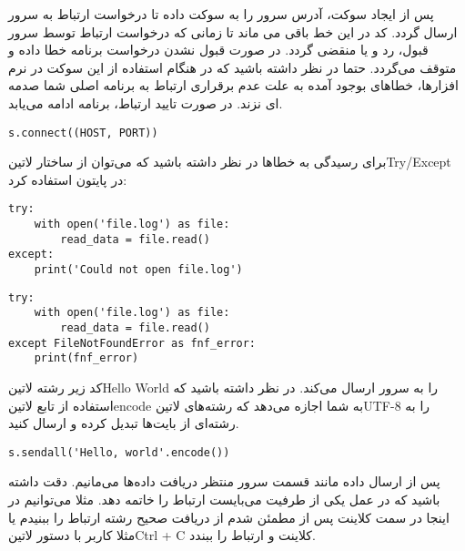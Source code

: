 \documentclass[]{article}
\begin{document}
  پس از ایجاد سوکت، آدرس سرور را به سوکت داده تا درخواست ارتباط به سرور ارسال گردد.
  کد در این خط باقی می ماند تا زمانی که درخواست ارتباط توسط سرور قبول، رد و یا منقضی گردد.
  در صورت قبول نشدن درخواست برنامه خطا داده و متوقف می‌گردد.
  حتما در نظر داشته باشید که در هنگام استفاده از این سوکت در نرم افزارها، خطاهای بوجود آمده به علت عدم برقراری ارتباط به برنامه اصلی شما صدمه ای نزند.
  در صورت تایید ارتباط، برنامه ادامه می‌یابد.

  \begin{latin}
  \begin{verbatim}
s.connect((HOST, PORT))
  \end{verbatim}
  \end{latin}

برای رسیدگی به خطاها در نظر داشته باشید که می‌توان از ساختار ‌لاتین{Try/Except} در پایتون استفاده کرد:

  \begin{latin}
  \begin{verbatim}
try:
    with open('file.log') as file:
        read_data = file.read()
except:
    print('Could not open file.log')
  \end{verbatim}
  \end{latin}

  \begin{latin}
  \begin{verbatim}
try:
    with open('file.log') as file:
        read_data = file.read()
except FileNotFoundError as fnf_error:
    print(fnf_error)
  \end{verbatim}
  \end{latin}

  کد زیر رشته ‌لاتین{Hello World} را به سرور ارسال می‌کند. در نظر داشته باشید که استفاده از تابع ‌لاتین{encode}
  به شما اجازه می‌دهد که رشته‌های ‌لاتین{UTF-8} را به رشته‌ای از بایت‌ها تبدیل کرده و ارسال کنید.

  \begin{latin}
  \begin{verbatim}
s.sendall('Hello, world'.encode())
  \end{verbatim}
  \end{latin}

  پس از ارسال داده مانند قسمت سرور منتظر دریافت داده‌ها می‌مانیم. دقت داشته باشید که در عمل یکی از طرفیت می‌بایست ارتباط را خاتمه دهد.
  مثلا می‌توانیم در اینجا در سمت کلاینت پس از مطمئن شدم از دریافت صحیح رشته ارتباط را ببنیدم یا مثلا کاربر با دستور ‌لاتین{Ctrl + C}
  کلاینت و ارتباط را ببندد.
\end{document}
